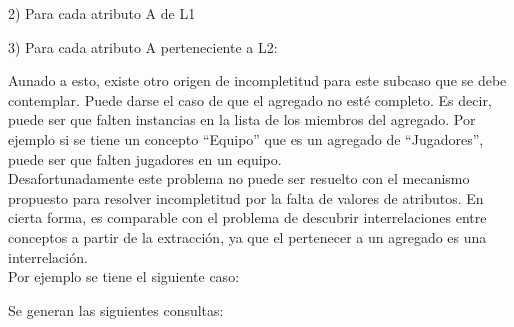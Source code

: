2) Para cada atributo A de L1 \\


3)  Para cada atributo A perteneciente a L2: \\


Aunado a esto, existe otro origen de incompletitud para este subcaso que se debe contemplar. Puede darse el caso de que el agregado no esté completo. Es decir, puede ser que falten instancias en la lista de los miembros del agregado. Por ejemplo si se tiene un concepto “Equipo” que es un agregado de “Jugadores”, puede ser que falten jugadores en un equipo.\\

Desafortunadamente este problema no puede ser resuelto con el mecanismo propuesto para resolver incompletitud por la falta de valores de atributos. En cierta forma, es comparable con el problema de descubrir interrelaciones entre conceptos a partir de la extracción, ya que el pertenecer a un agregado es una interrelación.\\
	
Por ejemplo se tiene el siguiente caso: \\


Se generan las siguientes consultas: \\



